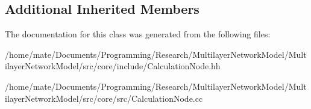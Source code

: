 \subsection*{Additional Inherited Members}


The documentation for this class was generated from the following files\+:\begin{DoxyCompactItemize}
\item 
/home/mate/\+Documents/\+Programming/\+Research/\+Multilayer\+Network\+Model/\+Multilayer\+Network\+Model/src/core/include/Calculation\+Node.\+hh\item 
/home/mate/\+Documents/\+Programming/\+Research/\+Multilayer\+Network\+Model/\+Multilayer\+Network\+Model/src/core/src/Calculation\+Node.\+cc\end{DoxyCompactItemize}

